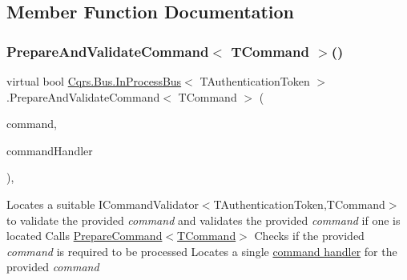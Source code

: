 \subsection{Member Function Documentation}
\mbox{\label{classCqrs_1_1Bus_1_1InProcessBus_a603950d39c407d5b9661dc0937fa67cc_a603950d39c407d5b9661dc0937fa67cc}} 
\subsubsection{\texorpdfstring{Prepare\+And\+Validate\+Command$<$ T\+Command $>$()}{PrepareAndValidateCommand< TCommand >()}}
{\footnotesize\ttfamily virtual bool \hyperlink{classCqrs_1_1Bus_1_1InProcessBus}{Cqrs.\+Bus.\+In\+Process\+Bus}$<$ T\+Authentication\+Token $>$.Prepare\+And\+Validate\+Command$<$ T\+Command $>$ (\begin{DoxyParamCaption}\item[{T\+Command}]{command,  }\item[{out \hyperlink{classCqrs_1_1Bus_1_1RouteHandlerDelegate}{Route\+Handler\+Delegate}}]{command\+Handler }\end{DoxyParamCaption})\hspace{0.3cm}{\ttfamily [protected]}, {\ttfamily [virtual]}}



Locates a suitable I\+Command\+Validator$<$\+T\+Authentication\+Token,\+T\+Command$>$ to validate the provided {\itshape command}  and validates the provided {\itshape command}  if one is located Calls \hyperlink{classCqrs_1_1Bus_1_1InProcessBus_ab0064808b1b619bee57fa5eff49bfca7_ab0064808b1b619bee57fa5eff49bfca7}{Prepare\+Command$<$\+T\+Command$>$} Checks if the provided {\itshape command}  is required to be processed Locates a single \hyperlink{classCqrs_1_1Bus_1_1RouteHandlerDelegate}{command handler} for the provided {\itshape command}  

